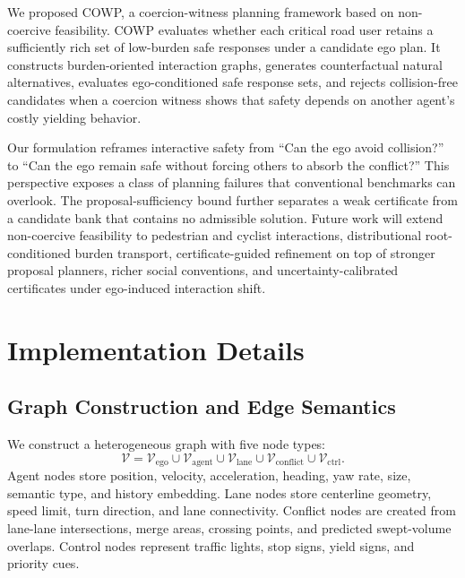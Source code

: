 \documentclass[10pt]{article}
\begin{document}
We proposed COWP, a coercion-witness planning framework based on non-coercive feasibility. COWP evaluates whether each critical road user retains a sufficiently rich set of low-burden safe responses under a candidate ego plan. It constructs burden-oriented interaction graphs, generates counterfactual natural alternatives, evaluates ego-conditioned safe response sets, and rejects collision-free candidates when a coercion witness shows that safety depends on another agent's costly yielding behavior.

Our formulation reframes interactive safety from ``Can the ego avoid collision?'' to ``Can the ego remain safe without forcing others to absorb the conflict?'' This perspective exposes a class of planning failures that conventional benchmarks can overlook. The proposal-sufficiency bound further separates a weak certificate from a candidate bank that contains no admissible solution. Future work will extend non-coercive feasibility to pedestrian and cyclist interactions, distributional root-conditioned burden transport, certificate-guided refinement on top of stronger proposal planners, richer social conventions, and uncertainty-calibrated certificates under ego-induced interaction shift.

\appendix

\section{Implementation Details}
\label{app:implementation_details}

\subsection{Graph Construction and Edge Semantics}
\label{app:graph_details}

We construct a heterogeneous graph with five node types:
\begin{equation}
    \mathcal{V}
    =
    \mathcal{V}_{\mathrm{ego}}
    \cup
    \mathcal{V}_{\mathrm{agent}}
    \cup
    \mathcal{V}_{\mathrm{lane}}
    \cup
    \mathcal{V}_{\mathrm{conflict}}
    \cup
    \mathcal{V}_{\mathrm{ctrl}} .
\end{equation}
Agent nodes store position, velocity, acceleration, heading, yaw rate, size, semantic type, and history embedding. Lane nodes store centerline geometry, speed limit, turn direction, and lane connectivity. Conflict nodes are created from lane-lane intersections, merge areas, crossing points, and predicted swept-volume overlaps. Control nodes represent traffic lights, stop signs, yield signs, and priority cues.
\end{document}
